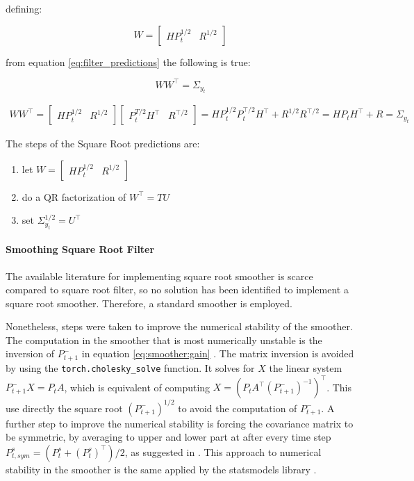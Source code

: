 \documentclass{article}
\begin{document}
defining:

\begin{equation*}
    W = \begin{bmatrix}HP_{t}^{1/2} & R^{1/2}\end{bmatrix}
\end{equation*}

from equation \ref{eq:filter_predictions} the following is true:

\begin{equation}\label{predict_SR_mult}
WW^\top = \Sigma_{y_t} 
\end{equation}

\begin{multline*}
  WW^\top =  \begin{bmatrix}HP_{t}^{1/2} & R^{1/2}\end{bmatrix}\begin{bmatrix}P_{t}^{T/2}H^\top & R^{\top/2}\end{bmatrix}
  = HP_{t}^{1/2}P_{t}^{\top/2}H^\top + R^{1/2}R^{\top/2} = HP_{t}H^\top + R = \Sigma_{y_t}
\end{multline*}

The steps of the Square Root predictions are:

\begin{enumerate}
    \item let  $W = \begin{bmatrix}HP_t^{1/2} & R^{1/2}\end{bmatrix}$
    \item do a QR factorization of $W^\top=TU$
    \item set $\Sigma_{y_t}^{1/2} = U^\top$
\end{enumerate}

\paragraph{Smoothing Square Root Filter} The available literature for implementing square root smoother is scarce compared to square root filter, so no solution has been identified to implement a square root smoother. Therefore, a standard smoother is employed.

Nonetheless, steps were taken to improve the numerical stability of the smoother. The computation in the smoother that is most numerically unstable is the inversion of $P^-_{t+1}$ in equation \ref{eq:smoother:gain} \cite{mohinder_s_grewal_kalman_2001}. The matrix inversion is avoided by using the \verb|torch.cholesky_solve| function. It solves for $X$ the linear system $P^-_{t+1}X=P_tA$, which is equivalent of computing $X = (P_tA^\top(P^-_{t+1})^{-1})^\top$. This use directly the square root $(P^-_{t+1})^{1/2}$ to avoid the computation of $P^-_{t+1}$. A further step to improve the numerical stability is forcing the covariance matrix to be symmetric, by averaging to upper and lower part at after every time step $P^s_{t, sym} = (P^s_t + (P^s_t)^\top)/2$, as suggested in \cite{dan_simon_optimal_2006}.
This approach to numerical stability in the smoother is the same applied by the \textsf{statsmodels} library \cite{noauthor_statsmodelstsastatespacekalman_filterkalmanfilter_nodate}.
\end{document}
